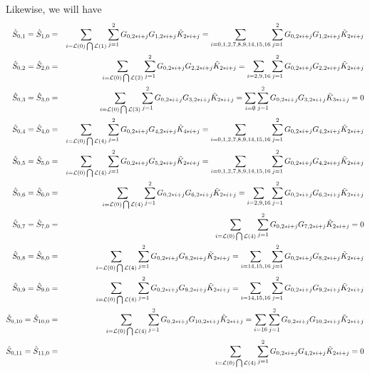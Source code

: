 Likewise, we  will have
\begin{eqnarray}
\hat{S}_{0,1}=\hat{S}_{1,0} 
&=& \sum_{i= {\cal L}(0) \bigcap {\cal L}(1)} \sum_{j=1}^2 G_{0,2*i+j} G_{1,2*i+j} \tilde{K}_{2*i+j} 
=\sum_{i= 0, 1, 2, 7, 8, 9, 14, 15, 16 } \sum_{j=1}^2 G_{0,2*i+j} G_{1,2*i+j} \tilde{K}_{2*i+j} 
\nonumber\\
\hat{S}_{0,2}=\hat{S}_{2,0} 
&=& \sum_{i={\cal L}(0) \bigcap {\cal L}(2)} \sum_{j=1}^2 G_{0,2*i+j} G_{2,2*i+j} \tilde{K}_{2*i+j} 
=\sum_{i=2,9,16} \sum_{j=1}^2 G_{0,2*i+j} G_{2,2*i+j} \tilde{K}_{2*i+j} 
\nonumber\\
\hat{S}_{0,3}=\hat{S}_{3,0} 
&=& \sum_{i= {\cal L}(0) \bigcap {\cal L}(3)} \sum_{j=1}^2 G_{0,2*i+j} G_{3,2*i+j} \tilde{K}_{2*i+j} 
=\sum_{i=\emptyset} \sum_{j=1}^2 G_{0,2*i+j} G_{3,2*i+j} \tilde{K}_{3*i+j} =0 \nonumber \\
\hat{S}_{0,4}=\hat{S}_{4,0} 
&=& \sum_{i= {\cal L}(0) \bigcap {\cal L}(4)} \sum_{j=1}^2 G_{0,2*i+j} G_{4,2*i+j} \tilde{K}_{4*i+j} 
=\sum_{i=0, 1, 2, 7, 8, 9, 14, 15, 16} \sum_{j=1}^2 G_{0,2*i+j} G_{4,2*i+j} \tilde{K}_{2*i+j} \nonumber\\
\hat{S}_{0,5}=\hat{S}_{5,0} 
&=& \sum_{i= {\cal L}(0) \bigcap {\cal L}(4)} \sum_{j=1}^2 G_{0,2*i+j} G_{5,2*i+j} \tilde{K}_{2*i+j} 
=\sum_{i=0, 1, 2, 7, 8, 9, 14, 15, 16} \sum_{j=1}^2 G_{0,2*i+j} G_{4,2*i+j} \tilde{K}_{2*i+j} \nonumber\\
\hat{S}_{0,6}=\hat{S}_{6,0} 
&=& \sum_{i= {\cal L}(0) \bigcap {\cal L}(4)} \sum_{j=1}^2 G_{0,2*i+j} G_{6,2*i+j} \tilde{K}_{2*i+j} 
= \sum_{i=2,9,16} \sum_{j=1}^2 G_{0,2*i+j} G_{6,2*i+j} \tilde{K}_{2*i+j} \nonumber\\
\hat{S}_{0,7}=\hat{S}_{7,0} 
&=& \sum_{i= {\cal L}(0) \bigcap {\cal L}(4)} \sum_{j=1}^2 G_{0,2*i+j} G_{7,2*i+j} \tilde{K}_{2*i+j} = 0\nonumber\\
\hat{S}_{0,8}=\hat{S}_{8,0} 
&=& \sum_{i= {\cal L}(0) \bigcap {\cal L}(4)} \sum_{j=1}^2 G_{0,2*i+j} G_{8,2*i+j} \tilde{K}_{2*i+j} 
=\sum_{i=14,15,16} \sum_{j=1}^2 G_{0,2*i+j} G_{8,2*i+j} \tilde{K}_{2*i+j} \nonumber\\
\hat{S}_{0,9}=\hat{S}_{9,0} 
&=& \sum_{i= {\cal L}(0) \bigcap {\cal L}(4)} \sum_{j=1}^2 G_{0,2*i+j} G_{9,2*i+j} \tilde{K}_{2*i+j} 
= \sum_{i=14,15,16} \sum_{j=1}^2 G_{0,2*i+j} G_{9,2*i+j} \tilde{K}_{2*i+j} \nonumber\\
\hat{S}_{0,10}=\hat{S}_{10,0} 
&=& \sum_{i= {\cal L}(0) \bigcap {\cal L}(4)} \sum_{j=1}^2 G_{0,2*i+j} G_{10,2*i+j} \tilde{K}_{2*i+j} 
= \sum_{i=16} \sum_{j=1}^2 G_{0,2*i+j} G_{10,2*i+j} \tilde{K}_{2*i+j} \nonumber\\
\hat{S}_{0,11}=\hat{S}_{11,0} 
&=& \sum_{i= {\cal L}(0) \bigcap {\cal L}(4)} \sum_{j=1}^2 G_{0,2*i+j} G_{4,2*i+j} \tilde{K}_{2*i+j} =0
\end{eqnarray}
